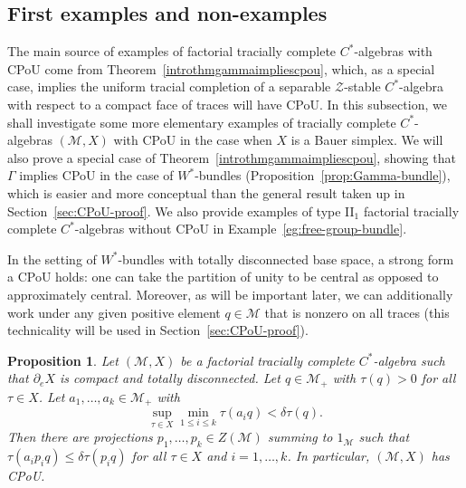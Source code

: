 \documentclass[a4paper,11pt]{amsart}
\newtheorem{proposition}[theorem]{Proposition}
\theoremstyle{definition}
\numberwithin{equation}{section}
\numberwithin{theorem}{section}
\newcommand{\M}{\mathcal{M}}
\begin{document}
\subsection{First examples and non-examples}\label{sec:cpou-examples}

The main source of examples of factorial tracially complete $C^*$-algebras with CPoU come from Theorem~\ref{introthmgammaimpliescpou}, which, as a special case, implies the uniform tracial completion of a separable $\mathcal Z$-stable $C^*$-algebra with respect to a compact face of traces will have CPoU.  In this subsection, we shall investigate some more elementary examples of tracially complete $C^*$-algebras $(\M,X)$ with CPoU in the case when $X$ is a Bauer simplex.  We will also prove a special case of Theorem~\ref{introthmgammaimpliescpou}, showing that  $\Gamma$ implies CPoU in the case of $W^*$-bundles (Proposition~\ref{prop:Gamma-bundle}), which is easier and more conceptual than the general result taken up in Section~\ref{sec:CPoU-proof}. We also provide examples of type II$_1$ factorial tracially complete $C^*$-algebras without CPoU in Example~\ref{eg:free-group-bundle}.

In the setting of $W^*$-bundles with totally disconnected base space, a strong form a CPoU holds: one can take the partition of unity to be central as opposed to approximately central. Moreover, as will be important later, we can additionally work under any given positive element $q \in \M$ that is nonzero on all traces (this technicality will be used in Section~\ref{sec:CPoU-proof}).

\begin{proposition}
	\label{prop:ZeroDimBoundary}
	Let $(\M,X)$ be a factorial tracially complete $C^*$-algebra such that $\partial_e X$ is compact and totally disconnected. Let $q \in \M_+$ with $\tau(q) > 0$ for all $\tau \in X$. Let $a_1, \ldots, a_k \in \M_+$ with
	\begin{equation}
		 \sup_{\tau \in X} \min_{1 \leq i \leq k} \tau(a_iq) < \delta \tau(q).
	\end{equation}
	Then there are projections $p_1, \ldots, p_k \in Z(\M)$ summing to $1_\mathcal M$ such that $\tau(a_i p_i q) \leq \delta \tau(p_i q)$ for all $\tau \in X$ and $i = 1,\ldots, k$.  In particular, $(\M,X)$ has CPoU.
\end{proposition}
\end{document}
